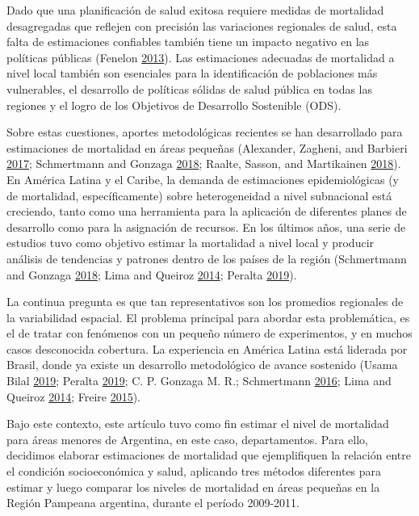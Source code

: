 \documentclass[12pt,]{article}
\begin{document}
Dado que una planificación de salud exitosa requiere medidas de
mortalidad desagregadas que reflejen con precisión las variaciones
regionales de salud, esta falta de estimaciones confiables también tiene
un impacto negativo en las políticas públicas (Fenelon
\protect\hyperlink{ref-Fenelon2013}{2013}). Las estimaciones adecuadas
de mortalidad a nivel local también son esenciales para la
identificación de poblaciones más vulnerables, el desarrollo de
políticas sólidas de salud pública en todas las regiones y el logro de
los Objetivos de Desarrollo Sostenible (ODS).

Sobre estas cuestiones, aportes metodológicas recientes se han
desarrollado para estimaciones de mortalidad en áreas pequeñas
(Alexander, Zagheni, and Barbieri
\protect\hyperlink{ref-Alexander2017}{2017}; Schmertmann and Gonzaga
\protect\hyperlink{ref-Schmertmann2018}{2018}; Raalte, Sasson, and
Martikainen \protect\hyperlink{ref-van_Raalte1002}{2018}). En América
Latina y el Caribe, la demanda de estimaciones epidemiológicas (y de
mortalidad, específicamente) sobre heterogeneidad a nivel subnacional
está creciendo, tanto como una herramienta para la aplicación de
diferentes planes de desarrollo como para la asignación de recursos. En
los últimos años, una serie de estudios tuvo como objetivo estimar la
mortalidad a nivel local y producir análisis de tendencias y patrones
dentro de los países de la región (Schmertmann and Gonzaga
\protect\hyperlink{ref-Schmertmann2018}{2018}; Lima and Queiroz
\protect\hyperlink{ref-LimaQueiroz2014}{2014}; Peralta
\protect\hyperlink{ref-Peralta2019}{2019}).

La continua pregunta es que tan representativos son los promedios
regionales de la variabilidad espacial. El problema principal para
abordar esta problemática, es el de tratar con fenómenos con un pequeño
número de experimentos, y en muchos casos desconocida cobertura. La
experiencia en América Latina está liderada por Brasil, donde ya existe
un desarrollo metodológico de avance sostenido (Usama Bilal
\protect\hyperlink{ref-Bilal2019}{2019}; Peralta
\protect\hyperlink{ref-Peralta2019}{2019}; C. P. Gonzaga M. R.;
Schmertmann \protect\hyperlink{ref-GonzagaSchmertmann2016}{2016}; Lima
and Queiroz \protect\hyperlink{ref-LimaQueiroz2014}{2014}; Freire
\protect\hyperlink{ref-FreireEtAl2015}{2015}).

Bajo este contexto, este artículo tuvo como fin estimar el nivel de
mortalidad para áreas menores de Argentina, en este caso, departamentos.
Para ello, decidimos elaborar estimaciones de mortalidad que
ejemplifiquen la relación entre el condición socioeconómica y salud,
aplicando tres métodos diferentes para estimar y luego comparar los
niveles de mortalidad en áreas pequeñas en la Región Pampeana argentina,
durante el período 2009-2011.
\end{document}
